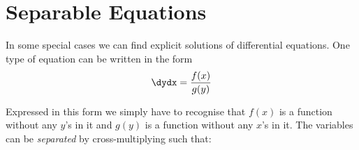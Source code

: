 \section{Separable Equations}
In some special cases we can find explicit solutions of differential equations. One type of equation can be written in the form
\begin{equation*}\dydx =\frac{f (x)}{g (y)}
\end{equation*}

Expressed in this form we simply have to recognise that $f (x)$ is a function without any $y$'s in it and $g (y)$ is a function without any $x$'s in it. The variables can be \textit{separated} by cross-multiplying such that:

